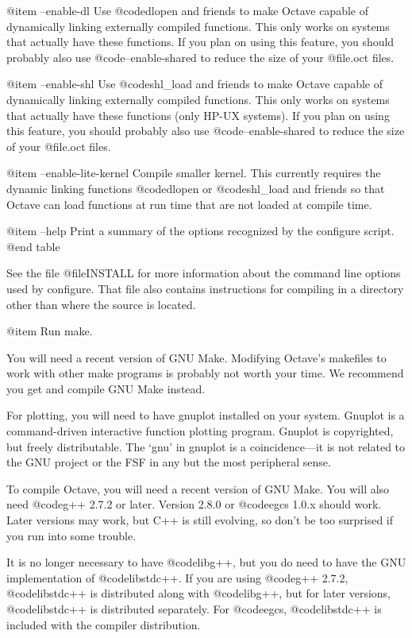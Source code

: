 @item --enable-dl
Use @code{dlopen} and friends to make Octave capable of dynamically
linking externally compiled functions.  This only works on systems that
actually have these functions.  If you plan on using this feature, you
should probably also use @code{--enable-shared} to reduce the size of
your @file{.oct} files.

@item --enable-shl
Use @code{shl_load} and friends to make Octave capable of dynamically
linking externally compiled functions.  This only works on systems that
actually have these functions (only HP-UX systems).  If you plan on
using this feature, you should probably also use @code{--enable-shared}
to reduce the size of your @file{.oct} files.

@item --enable-lite-kernel
Compile smaller kernel.  This currently requires the dynamic linking
functions @code{dlopen} or @code{shl_load} and friends so that Octave
can load functions at run time that are not loaded at compile time.

@item --help
Print a summary of the options recognized by the configure script.
@end table

See the file @file{INSTALL} for more information about the command line
options used by configure.  That file also contains instructions for
compiling in a directory other than where the source is located.

@item
Run make.

You will need a recent version of GNU Make.  Modifying Octave's
makefiles to work with other make programs is probably not worth
your time.  We recommend you get and compile GNU Make instead.

For plotting, you will need to have gnuplot installed on your system.
Gnuplot is a command-driven interactive function plotting program.
Gnuplot is copyrighted, but freely distributable.  The `gnu' in gnuplot
is a coincidence---it is not related to the GNU project or the FSF in
any but the most peripheral sense.

To compile Octave, you will need a recent version of GNU Make.  You
will also need @code{g++} 2.7.2 or later.  Version 2.8.0 or @code{egcs}
1.0.x should work.  Later versions may work, but C++ is still evolving,
so don't be too surprised if you run into some trouble.

It is no longer necessary to have @code{libg++}, but you do need to have
the GNU implementation of @code{libstdc++}.  If you are using @code{g++}
2.7.2, @code{libstdc++} is distributed along with @code{libg++}, but for
later versions, @code{libstdc++} is distributed separately.  For
@code{egcs}, @code{libstdc++} is included with the compiler
distribution.

